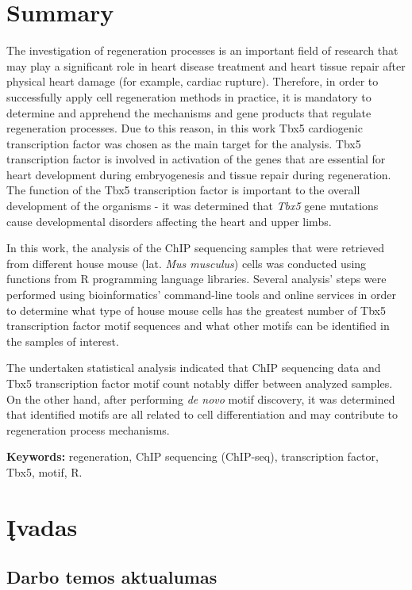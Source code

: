 \documentclass[12pt]{article}
\begin{document}
\section*{Summary}
The investigation of regeneration processes is an important field of research
that may play a significant role in heart disease treatment and heart tissue
repair after physical heart damage (for example, cardiac rupture).
Therefore, in order to successfully apply cell regeneration methods in practice,
it is mandatory to determine and apprehend the mechanisms and gene
products that regulate regeneration processes. Due to this reason, in this
work Tbx5 cardiogenic transcription factor was chosen as the main target
for the analysis. Tbx5 transcription factor is involved in activation of the
genes that are essential for heart development during embryogenesis and
tissue repair during regeneration. The function of the Tbx5 transcription factor
is important to the overall development of the organisms -  it was determined that
\emph{Tbx5} gene mutations cause developmental disorders affecting the
heart and upper limbs.

In this work, the analysis of the ChIP sequencing samples that were
retrieved from different house mouse (lat. \emph{Mus musculus}) cells was
conducted using functions from R programming language libraries. Several
analysis' steps were performed using bioinformatics' command-line tools and
online services in order to determine what type of house mouse cells has
the greatest number of Tbx5 transcription factor motif sequences and what
other motifs can be identified in the samples of interest.

The undertaken statistical analysis indicated that ChIP sequencing data and
Tbx5 transcription factor motif count notably differ between analyzed
samples. On the other hand, after performing \emph{de novo} motif discovery, it
was determined that identified motifs are all related to cell differentiation
and may contribute to regeneration process mechanisms.

\hfill \break
\textbf{Keywords:} regeneration, ChIP sequencing (ChIP-seq),
    transcription factor, Tbx5, motif, R.
\newpage


\section{Įvadas}
\subsection*{Darbo temos aktualumas}
\end{document}
